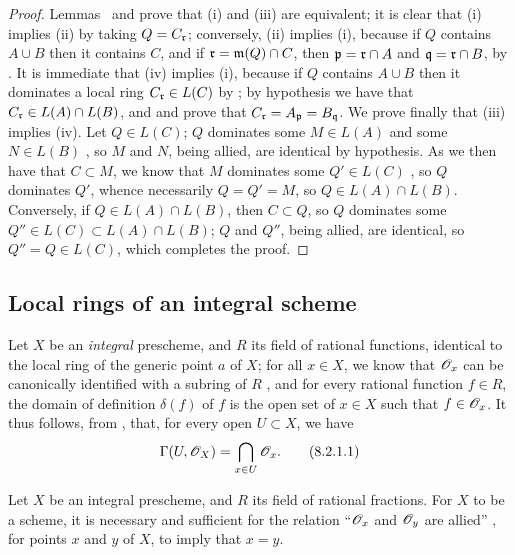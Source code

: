 \begin{proof}
\label{proof-1.8.1.5}
Lemmas~ and  prove that (i) and (iii) are equivalent;
it is clear that (i) implies (ii) by taking $Q=C_\mathfrak{r}$;
conversely, (ii) implies (i), because if $Q$ contains $A\cup B$ then it contains $C$, and if $\mathfrak{r}=\mathfrak{m}(Q)\cap C$, then $\mathfrak{p}=\mathfrak{r}\cap A$ and $\mathfrak{q}=\mathfrak{r}\cap B$, by .
It is immediate that (iv) implies (i), because if $Q$ contains $A\cup B$ then it dominates a local ring $C_\mathfrak{r}\in L(C)$ by ;
by hypothesis we have that $C_\mathfrak{r}\in L(A)\cap L(B)$, and  and  prove that $C_\mathfrak{r}=A_\mathfrak{p}=B_\mathfrak{q}$.
We prove finally that (iii) implies (iv).
Let $Q\in L(C)$;
$Q$ dominates some $M\in L(A)$ and some $N\in L(B)$ , so $M$ and $N$, being allied, are identical by hypothesis.
As we then have that $C\subset M$, we know that $M$ dominates some $Q'\in L(C)$ , so $Q$ dominates $Q'$, whence necessarily  $Q=Q'=M$, so $Q\in L(A)\cap L(B)$.
Conversely, if $Q\in L(A)\cap L(B)$, then $C\subset Q$, so  $Q$ dominates some $Q''\in L(C)\subset L(A)\cap L(B)$;
$Q$ and $Q''$, being allied, are identical, so $Q''=Q\in L(C)$, which completes the proof.
\end{proof}

\subsection{Local rings of an integral scheme}
\label{subsection:local-rings-of-integral-scheme}

\begin{env}[8.2.1]
\label{1.8.2.1}
Let $X$ be an \emph{integral} prescheme, and $R$ its field of rational functions, identical to the local ring of the generic point $a$ of $X$;
for all $x\in X$, we know that $\mathscr{O}_x$ can be canonically identified with a subring of $R$ , and for every rational function $f\in R$, the domain of definition $\delta(f)$ of $f$ is the open set of $x\in X$ such that
$f\in\mathscr{O}_x$.
It thus follows, from , that, for every open $U\subset X$, we have
\begin{equation*}
  \label{1.8.2.1.1}
  \Gamma(U,\mathscr{O}_X)=\bigcap_{x\in U}\mathscr{O}_x.
  \tag{8.2.1.1}
\end{equation*}
\end{env}

\begin{prop}[8.2.2]
\label{1.8.2.2}
Let $X$ be an integral prescheme, and $R$ its field of rational fractions. For $X$ to be a scheme, it is necessary and sufficient for the relation ``$\mathscr{O}_x$ and $\mathscr{O}_y$ are allied'' , for points $x$ and $y$ of $X$, to imply that $x=y$.
\end{prop}

